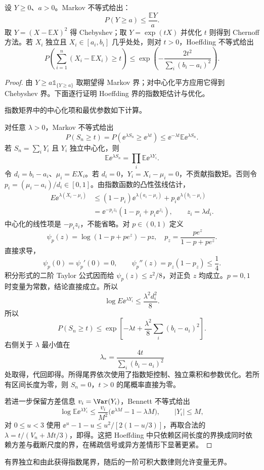 \begin{proposition}
设 $Y\ge0$、$a>0$。Markov 不等式给出：
\[
P(Y\ge a)\le\frac{\mathbb E Y}{a}.
\]
取 $Y=(X-\mathbb E X)^2$ 得 Chebyshev；取 $Y=\exp(tX)$ 并优化 $t$ 则得到 Chernoff 方法。若 $X_i$ 独立且 $X_i\in[a_i,b_i]$ 几乎处处，则对 $t>0$，Hoeffding 不等式给出
\begin{equation}
P\!\left(
\sum_{i=1}^n(X_i-\mathbb E X_i)\ge t
\right)
\le
\exp\!\left(
-\frac{2t^2}{\sum_i(b_i-a_i)^2}
\right).
\label{eq:math-stat-hoeffding}
\end{equation}
\end{proposition}
\begin{proof}
由 $Y\ge a\mathds{1}_{\{Y\ge a\}}$ 取期望得 Markov 界；对中心化平方应用它得到 Chebyshev 界。下面逐行证明 Hoeffding 界的指数矩估计与优化。

指数矩界中的中心化项和最优参数如下计算。

对任意 $\lambda>0$，Markov 不等式给出
\[
P(S_n\ge t)
=P(\ee^{\lambda S_n}\ge\ee^{\lambda t})
\le
\ee^{-\lambda t}\mathbb E\ee^{\lambda S_n}.
\]
若 $S_n=\sum_iY_i$ 且 $Y_i$ 独立中心化，则
\[
\mathbb E\ee^{\lambda S_n}
=\prod_i\mathbb E\ee^{\lambda Y_i}.
\]
令 $d_i=b_i-a_i$、$\mu_i=EX_i$。若 $d_i=0$，$Y_i=X_i-\mu_i=0$，不贡献指数矩。否则令 $p_i=(\mu_i-a_i)/d_i\in[0,1]$。由指数函数的凸性弦线估计，
\begin{align*}
 E\ee^{\lambda(X_i-\mu_i)}
 &\le(1-p_i)\ee^{\lambda(a_i-\mu_i)}+p_i \ee^{\lambda(b_i-\mu_i)}\\
 &=\ee^{-p_i z_i}(1-p_i+p_i \ee^{z_i}),\qquad z_i=\lambda d_i.
\end{align*}
中心化的线性项是 $-p_i z_i$，不能省略。对 $p\in(0,1)$ 定义
\[
 \psi_p(z)=\log(1-p+pe^z)-pz,
 \quad p_z=\frac{pe^z}{1-p+pe^z}.
\]
直接求导，
\[
 \psi_p(0)=\psi_p'(0)=0,\qquad
 \psi_p''(z)=p_z(1-p_z)\le\frac14.
\]
积分形式的二阶 Taylor 公式因而给 $\psi_p(z)\le z^2/8$，对正负 $z$ 均成立。$p=0,1$ 时变量为常数，结论直接成立。所以
\[
 \log E\ee^{\lambda Y_i}\le\frac{\lambda^2d_i^2}{8}.
\]
所以
\[
P(S_n\ge t)
\le
\exp\!\left[
-\lambda t
+\frac{\lambda^2}{8}\sum_i(b_i-a_i)^2
\right].
\]
右侧关于 $\lambda$ 最小值在
\[
\lambda_*
=\frac{4t}{\sum_i(b_i-a_i)^2}
\]
处取得，代回即得。所得尾界依次使用了指数矩控制、独立乘积和参数优化。若所有区间长度为零，则 $S_n=0$，$t>0$ 的尾概率直接为零。

若进一步保留方差信息 $v_i=\Var(Y_i)$，Bennett 不等式给出
\[
\log\mathbb E\ee^{\lambda Y_i}
\le
\frac{v_i}{M^2}\bigl(\ee^{\lambda M}-1-\lambda M\bigr),
\qquad |Y_i|\le M,
\]
对 $0\le u<3$ 使用 $\ee^u-1-u\le u^2/[2(1-u/3)]$，再取合法的 $\lambda=t/(V_n+Mt/3)$，即得。这把 Hoeffding 中只依赖区间长度的界换成同时依赖方差与截断尺度的界，在稀疏信号或异方差情形下显著更紧。
\end{proof}
有界独立和由此获得指数尾界，随后的一阶可积大数律则允许变量无界。


